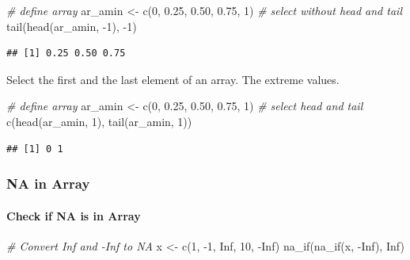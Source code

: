 \documentclass[
]{book}
\newenvironment{Shaded}{\begin{snugshade}}{\end{snugshade}}
\newcommand{\CommentTok}[1]{\textcolor[rgb]{0.56,0.35,0.01}{\textit{#1}}}
\newcommand{\ConstantTok}[1]{\textcolor[rgb]{0.00,0.00,0.00}{#1}}
\newcommand{\DecValTok}[1]{\textcolor[rgb]{0.00,0.00,0.81}{#1}}
\newcommand{\FloatTok}[1]{\textcolor[rgb]{0.00,0.00,0.81}{#1}}
\newcommand{\FunctionTok}[1]{\textcolor[rgb]{0.00,0.00,0.00}{#1}}
\newcommand{\NormalTok}[1]{#1}
\newcommand{\OtherTok}[1]{\textcolor[rgb]{0.56,0.35,0.01}{#1}}
\newcommand{\SpecialCharTok}[1]{\textcolor[rgb]{0.00,0.00,0.00}{#1}}
\begin{document}
\begin{Shaded}
\begin{Highlighting}[]
\CommentTok{\# define array}
\NormalTok{ar\_amin }\OtherTok{\textless{}{-}} \FunctionTok{c}\NormalTok{(}\DecValTok{0}\NormalTok{, }\FloatTok{0.25}\NormalTok{, }\FloatTok{0.50}\NormalTok{, }\FloatTok{0.75}\NormalTok{, }\DecValTok{1}\NormalTok{)}
\CommentTok{\# select without head and tail}
\FunctionTok{tail}\NormalTok{(}\FunctionTok{head}\NormalTok{(ar\_amin, }\SpecialCharTok{{-}}\DecValTok{1}\NormalTok{), }\SpecialCharTok{{-}}\DecValTok{1}\NormalTok{)}
\end{Highlighting}
\end{Shaded}

\begin{verbatim}
## [1] 0.25 0.50 0.75
\end{verbatim}

Select the first and the last element of an array. The extreme values.

\begin{Shaded}
\begin{Highlighting}[]
\CommentTok{\# define array}
\NormalTok{ar\_amin }\OtherTok{\textless{}{-}} \FunctionTok{c}\NormalTok{(}\DecValTok{0}\NormalTok{, }\FloatTok{0.25}\NormalTok{, }\FloatTok{0.50}\NormalTok{, }\FloatTok{0.75}\NormalTok{, }\DecValTok{1}\NormalTok{)}
\CommentTok{\# select head and tail}
\FunctionTok{c}\NormalTok{(}\FunctionTok{head}\NormalTok{(ar\_amin, }\DecValTok{1}\NormalTok{), }\FunctionTok{tail}\NormalTok{(ar\_amin, }\DecValTok{1}\NormalTok{))}
\end{Highlighting}
\end{Shaded}

\begin{verbatim}
## [1] 0 1
\end{verbatim}

\hypertarget{na-in-array}{%
\subsubsection{NA in Array}\label{na-in-array}}

\hypertarget{check-if-na-is-in-array}{%
\paragraph{Check if NA is in Array}\label{check-if-na-is-in-array}}

\begin{Shaded}
\begin{Highlighting}[]
\CommentTok{\# Convert Inf and {-}Inf to NA}
\NormalTok{x }\OtherTok{\textless{}{-}} \FunctionTok{c}\NormalTok{(}\DecValTok{1}\NormalTok{, }\SpecialCharTok{{-}}\DecValTok{1}\NormalTok{, }\ConstantTok{Inf}\NormalTok{, }\DecValTok{10}\NormalTok{, }\SpecialCharTok{{-}}\ConstantTok{Inf}\NormalTok{)}
\FunctionTok{na\_if}\NormalTok{(}\FunctionTok{na\_if}\NormalTok{(x, }\SpecialCharTok{{-}}\ConstantTok{Inf}\NormalTok{), }\ConstantTok{Inf}\NormalTok{)}
\end{Highlighting}
\end{Shaded}
\end{document}
